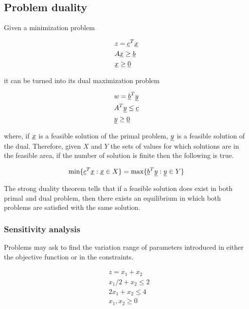 \subsection{Problem duality}

Given a minimization problem

\begin{align*}
& z = \underline{c}^T \underline{x} \\
& A \underline{x} \ge \underline{b} \\
& \underline{x} \ge \underline{0} \\
\end{align*}

it can be turned into its dual maximization problem

\begin{align*}
& w = \underline{b}^T \underline{y} \\
& A^T \underline{y} \le \underline{c} \\
& \underline{y} \ge \underline{0}
\end{align*}

where, if $\underline{x}$ is a feasible solution of the primal problem, $\underline{y}$ is a feasible solution of the dual.
Therefore, given $X$ and $Y$ the sets of values for which solutions are in the feasible area, if the number of solution is finite then the following is true.

$$
\min\{\underline{c}^T \underline{x} : \underline{x} \in X\} = \max\{\underline{b}^T \underline{y} : \underline{y} \in Y\}
$$

The strong duality theorem tells that if a feasible solution does exist in both primal and dual problem, then there exists an equilibrium in which both problems are satisfied with the same solution.

\subsubsection{Sensitivity analysis}

Problems may ask to find the variation range of parameters introduced in either the objective function or in the constraints.

\begin{align*}
    & z = x_1 + x_2 \\
    & x_1 / 2 + x_2 \le 2 \\
    & 2 x_1 + x_2 \le 4 \\
    & x_1, x_2 \ge 0
\end{align*}

